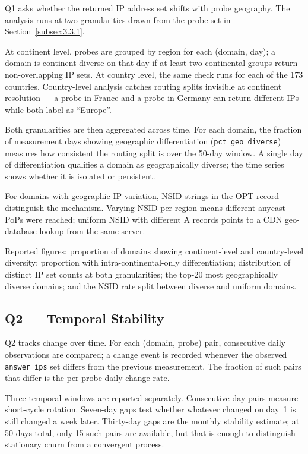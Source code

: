 Q1 asks whether the returned \ac{IP} address set shifts with probe geography. The analysis runs at two granularities drawn from the probe set in Section~\ref{subsec:3.3.1}.

At continent level, probes are grouped by region for each (domain, day); a domain is continent-diverse on that day if at least two continental groups return non-overlapping \ac{IP} sets. At country level, the same check runs for each of the 173 countries. Country-level analysis catches routing splits invisible at continent resolution --- a probe in France and a probe in Germany can return different \ac{IP}s while both label as ``Europe''.

Both granularities are then aggregated across time. For each domain, the fraction of measurement days showing geographic differentiation (\texttt{pct\_geo\_diverse}) measures how consistent the routing split is over the 50-day window. A single day of differentiation qualifies a domain as geographically diverse; the time series shows whether it is isolated or persistent.

For domains with geographic \ac{IP} variation, \ac{NSID} strings in the OPT record distinguish the mechanism. Varying \ac{NSID} per region means different anycast \ac{PoP}s were reached; uniform \ac{NSID} with different \ac{A} records points to a \ac{CDN} geo-database lookup from the same server.

Reported figures: proportion of domains showing continent-level and country-level diversity; proportion with intra-continental-only differentiation; distribution of distinct \ac{IP} set counts at both granularities; the top-20 most geographically diverse domains; and the \ac{NSID} rate split between diverse and uniform domains.

\subsection{Q2 --- Temporal Stability}
\label{subsec:3.5.2}

Q2 tracks change over time. For each (domain, probe) pair, consecutive daily observations are compared; a change event is recorded whenever the observed \texttt{answer\_ips} set differs from the previous measurement. The fraction of such pairs that differ is the per-probe daily change rate.

Three temporal windows are reported separately. Consecutive-day pairs measure short-cycle rotation. Seven-day gaps test whether whatever changed on day~1 is still changed a week later. Thirty-day gaps are the monthly stability estimate; at 50 days total, only 15 such pairs are available, but that is enough to distinguish stationary churn from a convergent process.

